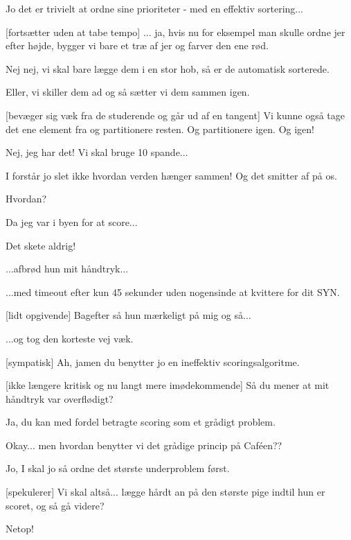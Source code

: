\documentclass[a4paper,11pt]{article}
\begin{document}
\begin{sketch}
   Jo det er trivielt at ordne sine prioriteter - med en effektiv
  sortering...


  [fortsætter uden at tabe tempo] ... ja, hvis nu for
  eksempel man skulle ordne jer efter højde, bygger vi bare et træ af
  jer og farver den ene rød.

   Nej nej, vi skal bare lægge dem i en stor hob, så er de automatisk
  sorterede.

   Eller, vi skiller dem ad og så sætter vi dem sammen igen.

  [bevæger sig væk fra de studerende og går ud af en tangent]
  Vi kunne også tage det ene element fra og partitionere resten. Og
  partitionere igen. Og igen!

   Nej, jeg har det! Vi skal bruge 10 spande...

   I forstår jo slet ikke hvordan verden hænger sammen! Og det smitter af
  på os.
  
   Hvordan?
  
   Da jeg var i byen for at score...

   Det skete aldrig!

   ...afbrød hun mit håndtryk...
  
   ...med timeout efter kun 45 sekunder uden nogensinde at kvittere for dit SYN.
  
  [lidt opgivende] Bagefter så hun mærkeligt på mig og så...
  
   ...og tog den korteste vej væk.

  [sympatisk] Ah, jamen du benytter jo en ineffektiv
  scoringsalgoritme.

  [ikke længere kritisk og nu langt mere imødekommende] Så du
  mener at mit håndtryk var overflødigt?

   Ja, du kan med fordel betragte scoring som et grådigt
  problem.

   Okay... men hvordan benytter vi det grådige princip på
  Caféen??

   Jo, I skal jo så ordne det største underproblem først.

  [spekulerer] Vi skal altså... lægge hårdt an på den største pige
  indtil hun er scoret, og så gå videre?

   Netop!

\end{sketch}
\end{document}
